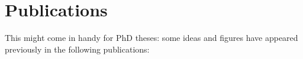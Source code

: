 \chapter*{Publications}
This might come in handy for PhD theses: some ideas and figures have appeared previously in the following publications:


\begin{refsection}[ownpubs]
    \small
    \nocite{*} %
    \printbibliography[heading=none]
\end{refsection}

